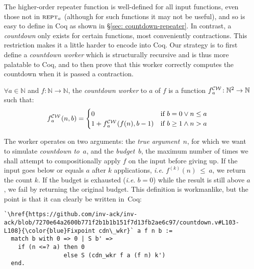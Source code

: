 The higher-order repeater function is well-defined for all input functions,
even those not in $\text{\scshape{rept}}_a$ (although for such functions it may not
be useful), and so is easy to define
in Coq as shown in \S\ref{sec: countdown-repeater}. In contrast, a
\emph{countdown} only exists for certain functions, most conveniently
contractions. This restriction makes it a little harder to encode into Coq.
Our strategy is to first define a \emph{countdown worker} which is
structurally recursive and is thus more palatable to Coq, and to then
prove that this worker correctly computes the countdown when it is 
passed a contraction.

\begin{defn} \label{defn: countdown-worker} \label{lem: cdt-init}
$\forall a\in \mathbb{N}$ and $f: \mathbb{N}\to \mathbb{N}$, the
\emph{countdown worker}
to $a$ of $f$ is a function $\cdw{f}{a}\ : \mathbb{N}^2\to \mathbb{N}$ such that:
\begin{equation*}
\cdw{f}{a}(n, b) = \begin{cases}
0 & \text{if } b = 0 \vee n\le a \\ 1 +\cdw{f}{a}(f(n), b-1) & \text{if } b \ge 1 \wedge n > a
\end{cases}
\end{equation*}
\end{defn}
\noindent The worker operates on two arguments:
the \emph{true argument}~$n$, for which we want to simulate
\emph{countdown to}~$a$,
and the \lb \emph{budget}~$b$, the maximum number of times we shall attempt
to compositionally apply $f$ on the input before giving up.
If the input goes below or equals $a$ after $k$ applications, \lb \emph{i.e.} $f^{(k)}(n)~\le~a$, we return the count $k$. If the budget is exhausted (\emph{i.e.} $b = 0$) while the result is still above $a$, we fail by returning the original budget. This definition is workmanlike, but the point is that it can clearly be written in~Coq:
\begin{lstlisting}
`\href{https://github.com/inv-ack/inv-ack/blob/7270e64a2600b771f2b1b1b151f7d13fb2ae6c97/countdown.v#L103-L108}{\color{blue}Fixpoint cdn\_wkr}` a f n b :=
  match b with 0 => 0 | S b' =>
    if (n <=? a) then 0
                 else S (cdn_wkr f a (f n) k')
  end.
\end{lstlisting}
